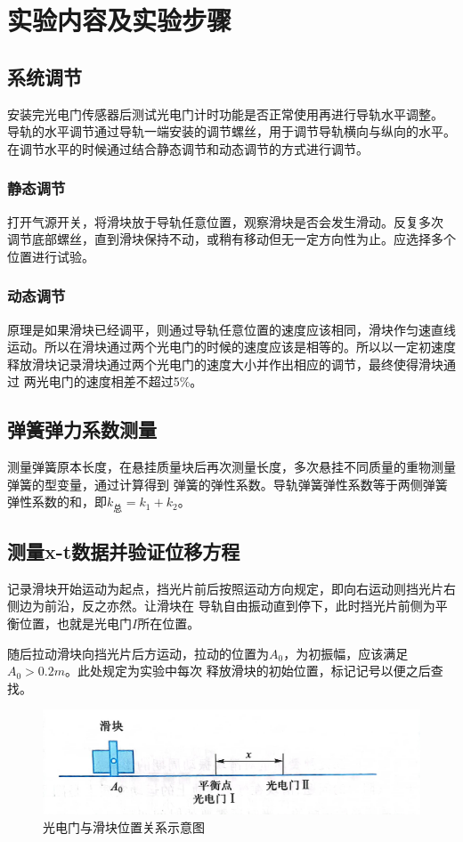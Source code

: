 \documentclass{ctexart}
\begin{document}
\section{实验内容及实验步骤}
  \subsection{系统调节}
  安装完光电门传感器后测试光电门计时功能是否正常使用再进行导轨水平调整。
  导轨的水平调节通过导轨一端安装的调节螺丝，用于调节导轨横向与纵向的水平。
  在调节水平的时候通过结合静态调节和动态调节的方式进行调节。
    \subsubsection{静态调节}
    打开气源开关，将滑块放于导轨任意位置，观察滑块是否会发生滑动。反复多次
    调节底部螺丝，直到滑块保持不动，或稍有移动但无一定方向性为止。应选择多个
    位置进行试验。
    \subsubsection{动态调节}
    原理是如果滑块已经调平，则通过导轨任意位置的速度应该相同，滑块作匀速直线
    运动。所以在滑块通过两个光电门的时候的速度应该是相等的。所以以一定初速度
    释放滑块记录滑块通过两个光电门的速度大小并作出相应的调节，最终使得滑块通过
    两光电门的速度相差不超过5\%。
  \subsection{弹簧弹力系数测量}
  测量弹簧原本长度，在悬挂质量块后再次测量长度，多次悬挂不同质量的重物测量弹簧的型变量，通过计算得到
  弹簧的弹性系数。导轨弹簧弹性系数等于两侧弹簧弹性系数的和，即$k_{\mbox{总}}=k_{1}+k_{2}$。
  \subsection{测量x-t数据并验证位移方程}
  记录滑块开始运动为起点，挡光片前后按照运动方向规定，即向右运动则挡光片右侧边为前沿，反之亦然。让滑块在
  导轨自由振动直到停下，此时挡光片前侧为平衡位置，也就是光电门$I$所在位置。

  随后拉动滑块向挡光片后方运动，拉动的位置为$A_{0}$，为初振幅，应该满足$A_{0}>0.2m$。此处规定为实验中每次
  释放滑块的初始位置，标记记号以便之后查找。
  \begin{figure}[h]
    \centering
    \includegraphics[height=0.3\textwidth,width=1\textwidth]{guangdianmenhuagui.jpg}
    \caption{光电门与滑块位置关系示意图}\label{figureweizhi}
  \end{figure}
\end{document}
